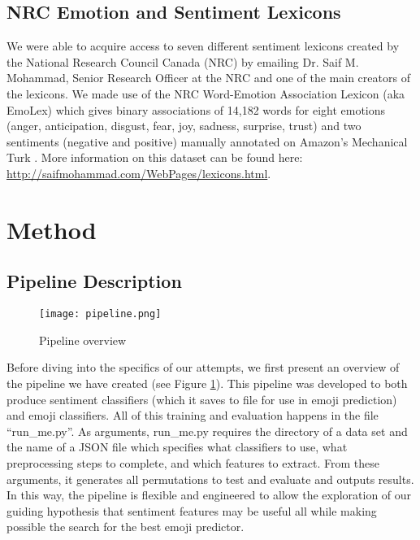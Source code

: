 \documentclass[11pt]{article}
\begin{document}
\subsection{NRC Emotion and Sentiment Lexicons}
We were able to acquire access to seven different sentiment lexicons created by the National Research Council Canada (NRC) by emailing Dr. Saif M. Mohammad, Senior Research Officer at the NRC and one of the main creators of the lexicons. We made use of the NRC Word-Emotion Association Lexicon (aka EmoLex) which gives binary associations of 14,182 words for eight emotions (anger, anticipation, disgust, fear, joy, sadness, surprise, trust) and two sentiments (negative and positive) manually annotated on Amazon's Mechanical Turk \cite{Mohammad13}. More information on this dataset can be found here: \url{http://saifmohammad.com/WebPages/lexicons.html}.

\section{Method} 

\subsection{Pipeline Description}
\label{subsec:pipeline}
\begin{figure}
    \centering
    \texttt{[image: pipeline.png]}
    \caption{Pipeline overview}
    \label{fig:pipeline}
\end{figure}
Before diving into the specifics of our attempts, we first present an overview of the pipeline we have created (see Figure \ref{fig:pipeline}). This pipeline was developed to both produce sentiment classifiers (which it saves to file for use in emoji prediction) and emoji classifiers. All of this training and evaluation happens in the file ``run\_me.py''. As arguments, run\_me.py requires the directory of a data set and the name of a JSON file which specifies what classifiers to use, what preprocessing steps to complete, and which features to extract. From these arguments, it generates all permutations to test and evaluate and outputs results. In this way, the pipeline is flexible and engineered to allow the exploration of our guiding hypothesis that sentiment features may be useful all while making possible the search for the best emoji predictor.
\end{document}
